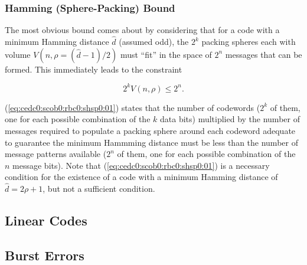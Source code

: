 \subsubsection{Hamming (Sphere-Packing) Bound}
\label{cedc0:scob0:rbc0:shsp0}

The most obvious bound comes about by considering that for a code with a
minimum Hamming distance $\hat{d}$ (assumed odd), the $2^k$ packing spheres each with
volume $V(n, \rho = (\hat{d}-1)/2 )$ must ``fit'' in the space 
of $2^n$ messages that can be formed.  This immediately leads to the 
constraint

\begin{equation}
\label{eq:cedc0:scob0:rbc0:shsp0:01}
2^k V(n, \rho) \leq 2^n .
\end{equation}

\noindent{}(\ref{eq:cedc0:scob0:rbc0:shsp0:01}) states that the number of codewords
($2^k$ of them, one for each possible combination of the $k$ data bits) multiplied 
by the number of messages required to populate a packing sphere around each codeword
adequate to guarantee
the minimum Hammming distance must be less than the number of message patterns
available ($2^n$ of them, one for each possible combination of the $n$ message bits).
Note that (\ref{eq:cedc0:scob0:rbc0:shsp0:01}) is a necessary condition for the existence
of a code with
a minimum Hamming distance of $\hat{d} = 2 \rho + 1$, but not a sufficient condition.


\subsection{Linear Codes}
\label{cedc0:scon0:slco0}


\subsection{Burst Errors}
\label{cedc0:scon0:sbhe0}

